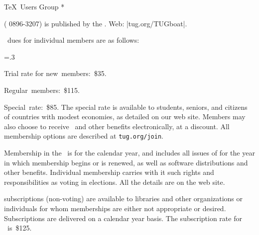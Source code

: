 


\TUBfinal

\def\rateyear{\the\year}
\def\tug{\acro{TUG}}
\def\rtitle{}

\def\USA{U\kern-.12em.\kern.04em S\kern-.06em.\kern.06em A\null.}

\head * \TeX\ Users Group *

\TUB\/ ( 0896-3207) is published by the\newline
\TUG{}. Web: |tug.org/TUGboat|.

\bigskip {}

\noindent
\rateyear\ dues for individual members are as follows:

\begingroup
\raggedstretch=.3\colwd
\raggedright
{}
\item{\bull} Trial rate for new~members:~\$35.
\item{\bull} Regular~members:~\$115.
\item{\bull} Special~rate:~\$85.
\unskip\endgraf
\endgroup       %
\noindent The special rate is available to students, seniors, and
citizens of countries with modest economies, as detailed on our web
site.
Members may also choose to receive \TUB\ and other benefits
electronically, at a discount. All membership options are described at
{\tt tug.org/join}.

Membership in the \TUG\ is for the calendar year, and includes all issues
of \TUB\/ for the year in which membership begins or is renewed, as well
as software distributions and other benefits.
Individual membership carries with
it such rights and responsibilities as voting in  elections.
All the details are on the  web site.

\bigskip {}

\noindent \TUB\/ subscriptions (non-voting) are available to libraries
and other organizations or individuals for whom 
memberships are either not appropriate or desired.
Subscriptions are delivered on a calendar year basis.
The subscription rate for
\rateyear\ is~\$125.

